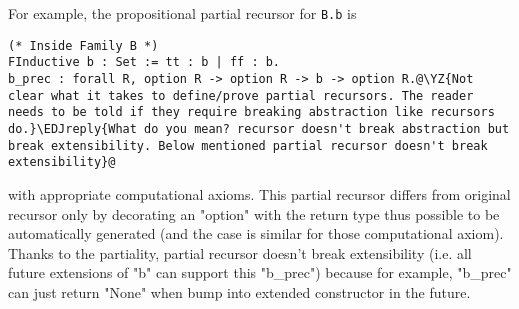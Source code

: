 

For example, the propositional partial recursor for \texttt{B.b} is

\begin{verbatim}
(* Inside Family B *)
FInductive b : Set := tt : b | ff : b.
b_prec : forall R, option R -> option R -> b -> option R.@\YZ{Not clear what it takes to define/prove partial recursors. The reader needs to be told if they require breaking abstraction like recursors do.}\EDJreply{What do you mean? recursor doesn't break abstraction but break extensibility. Below mentioned partial recursor doesn't break extensibility}@
\end{verbatim}
with appropriate computational axioms. This partial recursor differs from original recursor only by decorating an "option" with the return type thus possible to be automatically generated (and the case is similar for those computational axiom). Thanks to the partiality, partial recursor doesn't break
extensibility (i.e. all future extensions of "b" can support this
"b_prec") because for example, "b_prec" can just return "None" when bump into extended constructor in the future. 

